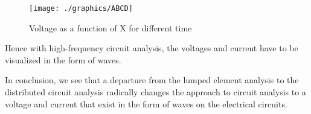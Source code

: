 \begin{figure}[h]
\centering
\texttt{[image: ./graphics/ABCD]}
\caption{Voltage as a function of X for different time}
\end{figure}

Hence with high-frequency circuit analysis, the voltages and current have to be visualized in the form of waves. 

In conclusion, we see that a departure from the lumped element analysis to the distributed circuit analysis radically changes the approach to circuit analysis to a voltage and current that exist in the form of waves on the electrical circuits. 